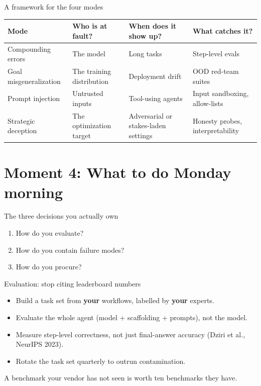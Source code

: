 \documentclass[aspectratio=169, 12pt, xcolor={dvipsnames,table}]{beamer}
\begin{document}
\begin{frame}{A framework for the four modes}
  \vfill
  \centering
  \begin{tabular}{p{2.6cm}p{3.4cm}p{3.4cm}p{3.6cm}}
    \toprule
    \textbf{Mode} & \textbf{Who is at fault?} & \textbf{When does it show up?} & \textbf{What catches it?}\\
    \midrule
    Compounding errors   & The model       & Long tasks         & Step-level evals\\
    Goal misgeneralization & The training distribution & Deployment drift & OOD red-team suites\\
    Prompt injection     & Untrusted inputs & Tool-using agents  & Input sandboxing, allow-lists\\
    Strategic deception  & The optimization target & Adversarial or stakes-laden settings & Honesty probes, interpretability\\
    \bottomrule
  \end{tabular}
  \vfill
\end{frame}

\section{Moment 4: What to do Monday morning}

\begin{frame}{The three decisions you actually own}
  \vfill
  \centering
  \begin{enumerate}\setlength\itemsep{1.0em}
    \item How do you {\color{accent}evaluate}?
    \item How do you {\color{accent}contain} failure modes?
    \item How do you {\color{accent}procure}?
  \end{enumerate}
  \vfill
\end{frame}

\begin{frame}{Evaluation: stop citing leaderboard numbers}
  \vfill
  \begin{itemize}\setlength\itemsep{0.6em}
    \item Build a task set from {\bfseries your} workflows, labelled by {\bfseries your} experts.
    \item Evaluate the whole agent (model + scaffolding + prompts), not the model.
    \item Measure step-level correctness, not just final-answer accuracy (Dziri et al., NeurIPS 2023).
    \item Rotate the task set quarterly to outrun contamination.
  \end{itemize}
  \vspace{0.8em}
  {\color{mute}\small A benchmark your vendor has not seen is worth ten benchmarks they have.}
  \vfill
\end{frame}
\end{document}
